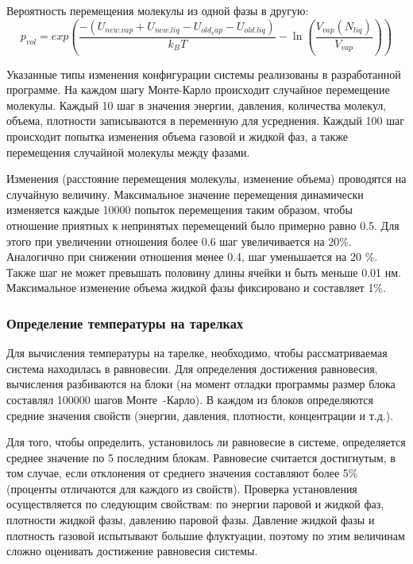 Вероятность перемещения молекулы из одной фазы в другую:
\begin{equation}
p_{vol} =  exp \left(\dfrac{-(U_{new.vap} + U_{new.liq} - U_{old_vap} - U_{old.liq})}{k_B T} 
- \ln \left( \dfrac{V_{vap} (N_{liq})}{V_{vap}} \right) \right) 
\end{equation}

Указанные типы изменения конфигурации системы реализованы в разработанной программе. На каждом шагу Монте-Карло происходит случайное перемещение молекулы. Каждый 10 шаг в значения энергии, давления, количества молекул, объема, плотности записываются в переменную для усреднения. Каждый 100 шаг происходит попытка изменения объема газовой и жидкой фаз, а также перемещения случайной молекулы между фазами.

Изменения (расстояние перемещения молекулы, изменение объема) проводятся на случайную величину. Максимальное значение перемещения динамически изменяется каждые 10000 попыток перемещения таким образом, чтобы отношение приятных к непринятых  перемещений было примерно равно 0.5. Для этого при увеличении отношения более 0.6 шаг увеличивается на 20\%. Аналогично при снижении отношения менее 0.4, шаг уменьшается на 20 \%. Также шаг не может превышать половину длины ячейки и быть меньше 0.01 нм. Максимальное изменение объема жидкой фазы фиксировано и составляет 1\%.

\subsubsection{Определение температуры на тарелках}

Для вычисления температуры на тарелке, необходимо, чтобы рассматриваемая система находилась в равновесии. Для определения достижения равновесия, вычисления разбиваются на блоки (на момент отладки программы размер блока составлял 100000 шагов Монте~-Карло). В каждом из блоков определяются средние значения свойств (энергии, давления, плотности, концентрации и т.д.). 

Для того, чтобы определить, установилось ли равновесие в системе, определяется среднее значение по 5 последним блокам. Равновесие считается достигнутым, в том случае, если отклонения от среднего значения составляют более 5\% (проценты отличаются для каждого из свойств).
Проверка установления осуществляется по следующим свойствам: по энергии паровой и жидкой фаз, плотности жидкой фазы, давлению паровой фазы.
Давление жидкой фазы и плотность газовой испытывают большие флуктуации, поэтому по этим величинам сложно оценивать достижение равновесия системы.

